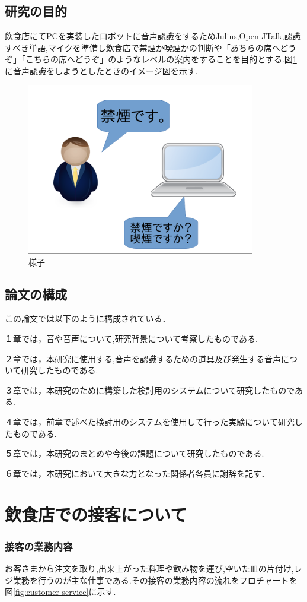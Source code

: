 \documentclass[12pt,oneside]{sotsuken_paper}
\begin{document}
\section{研究の目的}
飲食店にてPCを実装したロボットに音声認識をするためJulius,Open-JTalk,認識すべき単語,マイクを準備し飲食店で禁煙か喫煙かの判断や「あちらの席へどうぞ」「こちらの席へどうぞ」のようなレベルの案内をすることを目的とする.図\ref{fig:yousu}に音声認識をしようとしたときのイメージ図を示す.
\begin{figure}[htbp]
\begin{center}
\includegraphics[width=100mm]{img/Image.png}
\caption{様子}
\label{fig:yousu}
\end{center}
\end{figure}
\section{論文の構成}
この論文では以下のように構成されている．


１章では，音や音声について,研究背景について考察したものである.


２章では，本研究に使用する,音声を認識するための道具及び発生する音声について研究したものである.


３章では，本研究のために構築した検討用のシステムについて研究したものである.


４章では，前章で述べた検討用のシステムを使用して行った実験について研究したものである.


５章では，本研究のまとめや今後の課題について研究したものである.


６章では，本研究において大きな力となった関係者各員に謝辞を記す．
\chapter{飲食店での接客について}
\subsection{接客の業務内容}
お客さまから注文を取り,出来上がった料理や飲み物を運び,空いた皿の片付け,レジ業務を行うのが主な仕事である.その接客の業務内容の流れをフロチャートを図\ref{fig:customer-service}に示す.
\end{document}
